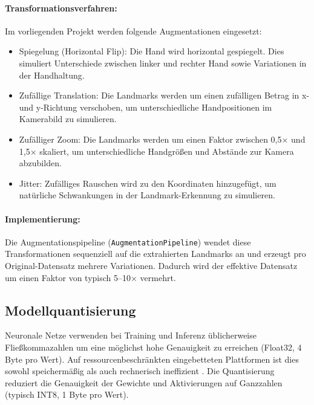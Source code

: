 \paragraph{Transformationsverfahren:} Im vorliegenden Projekt werden folgende Augmentationen eingesetzt:

\begin{itemize}
    \item Spiegelung (Horizontal Flip): Die Hand wird horizontal gespiegelt. Dies simuliert Unterschiede zwischen linker und rechter Hand sowie Variationen in der Handhaltung.
    \item Zufällige Translation: Die Landmarks werden um einen zufälligen Betrag in x- und y-Richtung verschoben, um unterschiedliche Handpositionen im Kamerabild zu simulieren.
    \item Zufälliger Zoom: Die Landmarks werden um einen Faktor zwischen 0,5$\times$ und 1,5$\times$ skaliert, um unterschiedliche Handgrößen und Abstände zur Kamera abzubilden.
    \item Jitter: Zufälliges Rauschen wird zu den Koordinaten hinzugefügt, um natürliche Schwankungen in der Landmark-Erkennung zu simulieren.
\end{itemize}

\paragraph{Implementierung:}
Die Augmentationspipeline (\texttt{AugmentationPipeline}) wendet diese Transformationen sequenziell auf die extrahierten Landmarks an und erzeugt pro Original-Datensatz mehrere Variationen. Dadurch wird der effektive Datensatz um einen Faktor von typisch 5--10$\times$ vermehrt.

\subsection{Modellquantisierung}\label{sub:modellquantisierung}

Neuronale Netze verwenden bei Training und Inferenz üblicherweise Fließkommazahlen um eine möglichst hohe Genauigkeit zu erreichen (Float32, 4 Byte pro Wert). Auf ressourcenbeschränkten eingebetteten Plattformen ist dies sowohl speichermäßig als auch rechnerisch ineffizient \cite{jacobQuantizationTrainingNeural2018}. Die Quantisierung reduziert die Genauigkeit der Gewichte und Aktivierungen auf Ganzzahlen (typisch INT8, 1 Byte pro Wert).

